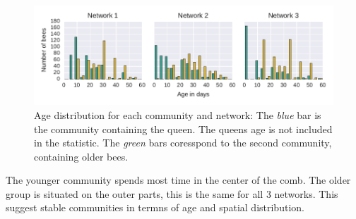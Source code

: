 \begin{figure}[htb]
	\centering
	\includegraphics[width=1.0\textwidth]{Figures/ageDistribution}
	\caption[Age distribution for each community and network] {Age distribution for each community and network: The \emph{blue} bar is the community containing the queen. The queens age is not included in the statistic. The \emph{green} bars coresspond to the second community, containing older bees.}
	\label{fig:ageDistribution}
\end{figure}

The younger community spends most time in the center of the comb. The older group is situated on the outer parts, this is the same for all 3 networks. This suggest stable communities in termns of age and spatial distribution.

